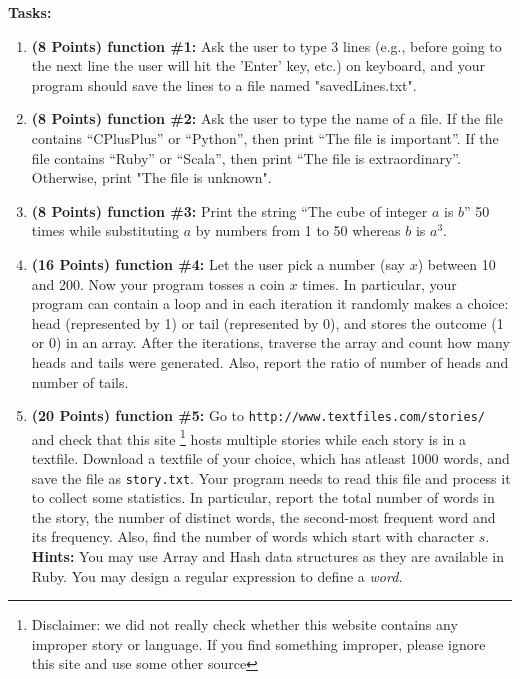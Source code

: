 \documentclass[paper=letter, fontsize=11pt]{scrartcl} %
\begin{document}
    \textbf{Tasks:}
    \begin{enumerate}[noitemsep]

        \item \textbf{(8 Points) function \#1:} Ask the user to type 3 lines (e.g., before going to the next line the user will hit the 'Enter' key, etc.) 
on keyboard, and your program should save the lines to a file named "savedLines.txt".
        \item \textbf{(8 Points) function \#2:} Ask the user to type the name of a file. If the file contains ``CPlusPlus'' or ``Python'', 
then print ``The file is important''. If the file contains ``Ruby'' or ``Scala'', then print ``The file is extraordinary''. Otherwise, print "The file is unknown". 
        \item \textbf{(8 Points) function \#3:} Print the string ``The cube of integer $a$ is $b$'' 50 times while substituting $a$ 
by numbers from 1 to 50 whereas $b$ is $a^3$.
        \item \textbf{(16 Points) function \#4:} Let the user pick a number (say $x$) between 10 and 200. Now your program tosses a coin $x$ times. 
In particular, your program can contain a loop and in each iteration it randomly makes a choice: 
head (represented by 1) or 
tail (represented by 0), and stores the outcome (1 or 0) 
in an array. After the iterations, traverse the array and count how many heads and tails were generated. 
Also, report the ratio of number of heads and number of tails.

        \item \textbf{(20 Points) function \#5:} Go to \texttt{http://www.textfiles.com/stories/} and check that this site 
\footnote {Disclaimer: we did not really check whether this website contains any improper story or language. 
If you find something improper, please ignore this site and use some other source} hosts multiple stories 
while each story is in a textfile. Download a textfile of your choice, which has atleast 1000 words, 
and save the file as \texttt{story.txt}. Your program needs to read this file and process it to 
collect some statistics. In particular, report the total number of words in the story, 
the number of distinct words, 
the second-most frequent word and its frequency. Also, find the number of words which start with character $s$. 
\textbf {Hints:} You may use Array and Hash data structures as they are available in Ruby. You may design a regular expression to define a \em{word}.  

    \end{enumerate}
 
\end{document}
